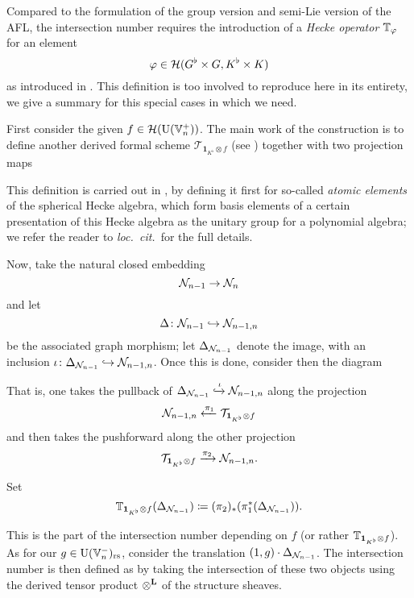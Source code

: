 Compared to the formulation of the group version and semi-Lie version of the AFL,
the intersection number requires the introduction of a
\emph{Hecke operator} $\mathbb T_{\varphi}$ for an element
\[ \varphi \in \mathcal H(G^\flat \times G, K^\flat \times K) \]
as introduced in \cite{ref:AFLspherical}.
This definition is too involved to reproduce here in its entirety,
we give a summary for this special cases in which we need.

First consider the given $f \in \mathcal H(\operatorname{U}(\mathbb V_n^+))$.
The main work of the construction is to define another
derived formal scheme $\mathcal{T}_{\mathbf{1}_{K^\flat} \otimes f}$
(see \cite[\S6.1]{ref:AFLspherical}) together with two projection maps
\begin{center}
\end{center}
This definition is carried out in \cite[\S5]{ref:AFLspherical},
by defining it first for so-called \emph{atomic elements} of the spherical Hecke algebra,
which form basis elements of a certain presentation of this Hecke algebra
as the unitary group for a polynomial algebra;
we refer the reader to \emph{loc.\ cit.}~for the full details.

Now, take the natural closed embedding
\[ \mathcal N_{n-1} \to \mathcal N_n \]
and let
\[ \Delta \colon \mathcal N_{n-1} \hookrightarrow \mathcal N_{n-1,n} \]
be the associated graph morphism; let $\Delta_{\mathcal N_{n-1}}$ denote the image,
with an inclusion $\iota \colon \Delta_{\mathcal N_{n-1}} \hookrightarrow \mathcal N_{n-1,n}$.
Once this is done, consider then the diagram
\begin{center}
\end{center}
That is, one takes the pullback of
$\Delta_{\mathcal N_{n-1}} \xhookrightarrow{\iota} \mathcal N_{n-1,n}$
along the projection
\[ \mathcal N_{n-1,n} \xleftarrow{\pi_1} \mathcal{T}_{\mathbf{1}_{K^\flat} \otimes f} \]
and then takes the pushforward along the other projection
\[ \mathcal{T}_{\mathbf{1}_{K^\flat} \otimes f} \xrightarrow{\pi_2} \mathcal N_{n-1,n}. \]
\begin{definition}
  Set
  \[
    \mathbb T_{\mathbf{1}_{K^\flat} \otimes f} (\Delta_{\mathcal N_{n-1}})
    \coloneqq (\pi_2)_\ast(\pi_1^\ast(\Delta_{\mathcal N_{n-1}})).
  \]
\end{definition}
This is the part of the intersection number depending on $f$
(or rather $\mathbb T_{\mathbf{1}_{K^\flat} \otimes f}$).
As for our $g \in \operatorname{U}(\mathbb V_n^-)_{\mathrm{rs}}$,
consider the translation $(1,g) \cdot \Delta_{\mathcal N_{n-1}}$.
The intersection number is then defined as by taking the intersection
of these two objects using the derived tensor product $\mathop{\otimes}^{\mathbf{L}}$ of the structure sheaves.

